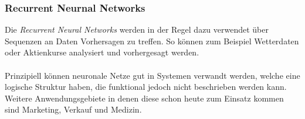\subsubsection*{Recurrent Neurnal Networks}

Die \textit{Recurrent Neural Networks} werden in der Regel dazu verwendet über Sequenzen an Daten Vorhersagen zu treffen. So können zum Beispiel Wetterdaten oder Aktienkurse analysiert und vorhergesagt werden.

\paragraph{}
Prinzipiell können neuronale Netze gut in Systemen verwandt werden, welche eine logische Struktur haben, die funktional jedoch nicht beschrieben werden kann. Weitere Anwendungsgebiete in denen diese schon heute zum Einsatz kommen sind Marketing, Verkauf und Medizin.



